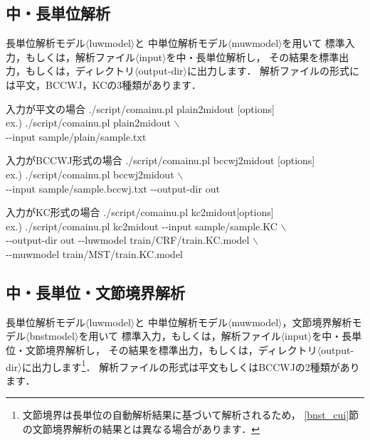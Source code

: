 \documentclass[titlepage]{jarticle}
\begin{document}
\subsection{中・長単位解析}\label{mid_long_cui}
長単位解析モデル$\langle$luwmodel$\rangle$と
中単位解析モデル$\langle$muwmodel$\rangle$を用いて
標準入力，もしくは，解析ファイル$\langle$input$\rangle$を中・長単位解析し，
その結果を標準出力，もしくは，ディレクトリ$\langle$output-dir$\rangle$に出力します．
解析ファイルの形式には平文，BCCWJ，KCの3種類があります．

\begin{itembox}[l]{入力が平文の場合}
./script/comainu.pl plain2midout [options] \\
ex.) ./script/comainu.pl plain2midout $\backslash$ \\
\hspace{10mm} {-}{-}input sample/plain/sample.txt
\end{itembox}

\begin{itembox}[l]{入力がBCCWJ形式の場合}
./script/comainu.pl bccwj2midout [options] \\
ex.) ./script/comainu.pl bccwj2midout $\backslash$ \\
\hspace{10mm} {-}{-}input sample/sample.bccwj.txt {-}{-}output-dir out
\end{itembox}

\begin{itembox}[l]{入力がKC形式の場合}
./script/comainu.pl kc2midout[options] \\
ex.) ./script/comainu.pl kc2midout {-}{-}input sample/sample.KC $\backslash$ \\
\hspace{10mm} {-}{-}output-dir out {-}{-}luwmodel train/CRF/train.KC.model $\backslash$ \\
\hspace{10mm} {-}{-}muwmodel train/MST/train.KC.model
\end{itembox}


\subsection{中・長単位・文節境界解析}\label{mid_long_bnst_cui}
長単位解析モデル$\langle$luwmodel$\rangle$と
中単位解析モデル$\langle$muwmodel$\rangle$，文節境界解析モデル$\langle$bnstmodel$\rangle$を用いて
標準入力，もしくは，解析ファイル$\langle$input$\rangle$を中・長単位・文節境界解析し，
その結果を標準出力，もしくは，ディレクトリ$\langle$output-dir$\rangle$に出力します\footnote{
文節境界は長単位の自動解析結果に基づいて解析されるため，
\ref{bnst_cui}節の文節境界解析の結果とは異なる場合があります．
}．
解析ファイルの形式は平文もしくはBCCWJの2種類があります．
\end{document}
